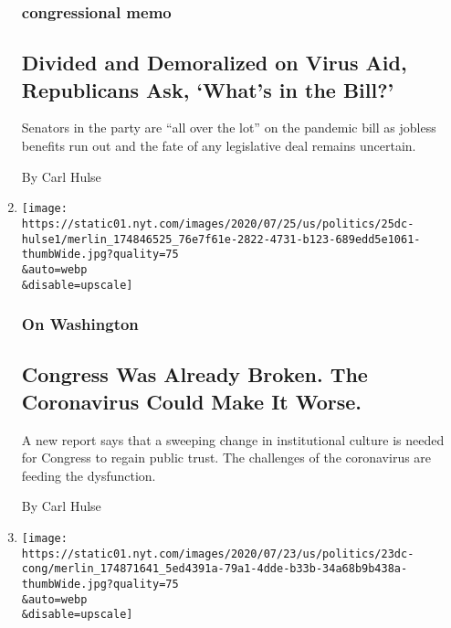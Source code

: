 \begin{enumerate}
{  \subsubsection{congressional memo}\label{congressional-memo}}

  \hypertarget{divided-and-demoralized-on-virus-aid-republicans-ask-whats-in-the-bill}{%
  \subsection{Divided and Demoralized on Virus Aid, Republicans Ask,
  `What's in the
  Bill?'}\label{divided-and-demoralized-on-virus-aid-republicans-ask-whats-in-the-bill}}

  Senators in the party are ``all over the lot'' on the pandemic bill as
  jobless benefits run out and the fate of any legislative deal remains
  uncertain.

  By Carl Hulse
\item
  \href{/2020/07/25/us/congress-broken-partisanship-coronavirus.html}{}

  \texttt{[image: https://static01.nyt.com/images/2020/07/25/us/politics/25dc-hulse1/merlin\_174846525\_76e7f61e-2822-4731-b123-689edd5e1061-thumbWide.jpg?quality=75\\\&auto=webp\\\&disable=upscale]}

  \hypertarget{on-washington}{%
  \subsubsection{On Washington}\label{on-washington}}

  \hypertarget{congress-was-already-broken-the-coronavirus-could-make-it-worse}{%
  \subsection{Congress Was Already Broken. The Coronavirus Could Make It
  Worse.}\label{congress-was-already-broken-the-coronavirus-could-make-it-worse}}

  A new report says that a sweeping change in institutional culture is
  needed for Congress to regain public trust. The challenges of the
  coronavirus are feeding the dysfunction.

  By Carl Hulse
\item
  \href{/2020/07/23/us/politics/republicans-stimulus-coronavirus.html}{}

  \texttt{[image: https://static01.nyt.com/images/2020/07/23/us/politics/23dc-cong/merlin\_174871641\_5ed4391a-79a1-4dde-b33b-34a68b9b438a-thumbWide.jpg?quality=75\\\&auto=webp\\\&disable=upscale]}


\end{enumerate}
